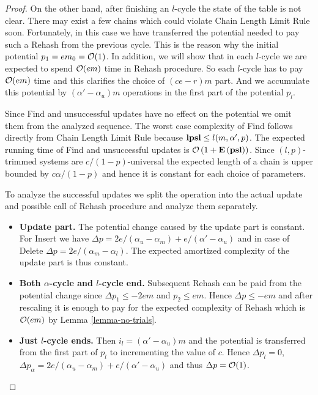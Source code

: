 \begin{proof}
On the other hand, after finishing an $l$-cycle the state of the table is not clear.
There may exist a few chains which could violate Chain Length Limit Rule soon.
Fortunately, in this case we have transferred the potential needed to pay such a Rehash from the previous cycle.
This is the reason why the initial potential $p_1 = em_0 = \mathcal{O}(1)$.
In addition, we will show that in each $l$-cycle we are expected to spend $\mathcal{O}(em)$ time in Rehash procedure.
So each $l$-cycle has to pay $\mathcal{O}(em)$ time and this clarifies the choice of $(ce - r)m$ part.
And we accumulate this potential by $(\alpha'-\alpha_u)m$ operations in the first part of the potential $p_l$.

Since Find and unsuccessful updates have no effect on the potential we omit them from the analyzed sequence. 
The worst case complexity of Find follows directly from Chain Length Limit Rule because $\mathbf{lpsl} \leq l(m, \alpha', p)$.
The expected running time of Find and unsuccessful updates is $\mathcal{O}\left(1 + \mathbf{E}\left(\mathbf{psl}\right)\right)$.
Since $(l, p)$-trimmed systems are $c/(1 - p)$-universal the expected length of a chain is upper bounded by $c\alpha/(1 - p)$ and hence it is constant for each choice of parameters.

To analyze the successful updates we split the operation into the actual update and possible call of Rehash procedure and analyze them separately.
\begin{itemize}
	\item \textbf{Update part.} 
The potential change caused by the update part is constant. 
For Insert we have $\Delta p = 2e/(\alpha_u - \alpha_m) + e/(\alpha' - \alpha_u)$ and in case of Delete $\Delta p = 2e/(\alpha_m - \alpha_l)$. 
The expected amortized complexity of the update part is thus constant. 

	\item \textbf{Both $\alpha$-cycle and $l$-cycle end.} 
Subsequent Rehash can be paid from the potential change since $\Delta p_1 \leq -2em$ and $p_2 \leq em$. 
Hence $\Delta p \leq -em$ and after rescaling it is enough to pay for the expected complexity of Rehash which is $\mathcal{O}(em)$ by Lemma \ref{lemma-no-trials}.

	\item \textbf{Just $l$-cycle ends.} 
Then $i_l = (\alpha' - \alpha_u)m$ and the potential is transferred from the first part of $p_l$ to incrementing the value of $c$. Hence $\Delta p_l = 0$, $\Delta p_\alpha = 2e/(\alpha_u - \alpha_m) + e/(\alpha' - \alpha_u)$ and thus $\Delta p = \mathcal{O}(1)$. 


\end{itemize}
\end{proof}
